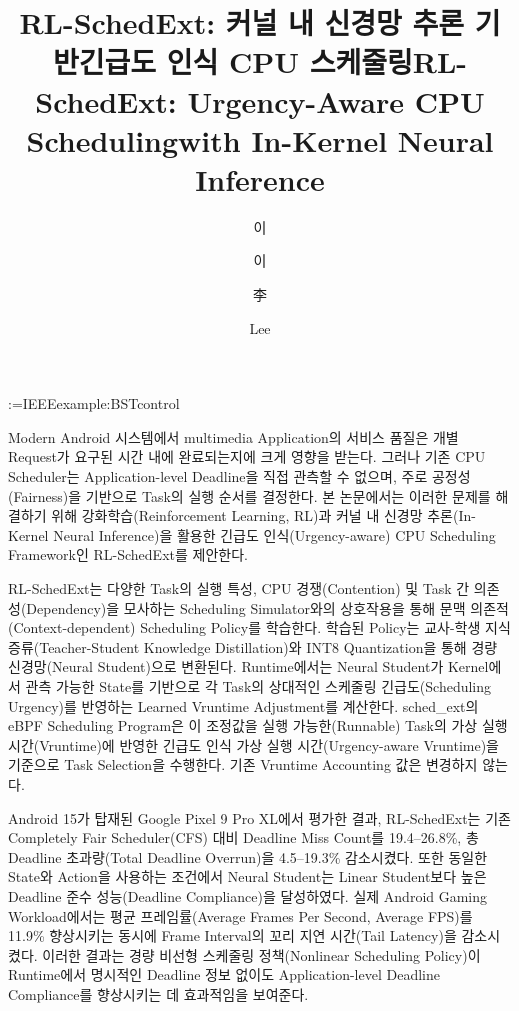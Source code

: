 \documentclass[master,korean,final]{kaist-ucs}
\title[korean] {RL-SchedExt: 커널 내 신경망 추론 기반\linebreak 긴급도 인식 CPU 스케줄링}
\title[english]{RL-SchedExt: Urgency-Aware CPU Scheduling\linebreak with In-Kernel Neural Inference}
\author[korean]{이}{재 원}
\author[korean2]{이}{재원}    %
\author[chinese]{李}{載遠}
\author[english]{Lee}{Jaewon}
\makeatletter
\providecommand{\bstctlcite}[1]{%
  \@bsphack
  \@for\@citeb:=#1\do{%
    \edef\@citeb{\expandafter\@firstofone\@citeb}%
    \if@filesw
      \immediate\write\@auxout{\string\citation{\@citeb}}%
    \fi
  }%
  \@esphack
}
\makeatother
\begin{document}
\bstctlcite{IEEEexample:BSTcontrol}


   \thesisinfo
    \begin{summary}      
    Modern Android 시스템에서 multimedia Application의 서비스 품질은 개별 Request가 요구된 시간 내에 완료되는지에 크게 영향을 받는다. 그러나 기존 CPU Scheduler는 Application-level Deadline을 직접 관측할 수 없으며, 주로 공정성(Fairness)을 기반으로 Task의 실행 순서를 결정한다. 본 논문에서는 이러한 문제를 해결하기 위해 강화학습(Reinforcement Learning, RL)과 커널 내 신경망 추론(In-Kernel Neural Inference)을 활용한 긴급도 인식(Urgency-aware) CPU Scheduling Framework인 RL-SchedExt를 제안한다.
    
    RL-SchedExt는 다양한 Task의 실행 특성, CPU 경쟁(Contention) 및 Task 간 의존성(Dependency)을 모사하는 Scheduling Simulator와의 상호작용을 통해 문맥 의존적(Context-dependent) Scheduling Policy를 학습한다. 학습된 Policy는 교사-학생 지식 증류(Teacher-Student Knowledge Distillation)와 INT8 Quantization을 통해 경량 신경망(Neural Student)으로 변환된다. Runtime에서는 Neural Student가 Kernel에서 관측 가능한 State를 기반으로 각 Task의 상대적인 스케줄링 긴급도(Scheduling Urgency)를 반영하는 Learned Vruntime Adjustment를 계산한다. sched\_ext의 eBPF Scheduling Program은 이 조정값을 실행 가능한(Runnable) Task의 가상 실행 시간(Vruntime)에 반영한 긴급도 인식 가상 실행 시간(Urgency-aware Vruntime)을 기준으로 Task Selection을 수행한다. 기존 Vruntime Accounting 값은 변경하지 않는다.
    
    Android 15가 탑재된 Google Pixel 9 Pro XL에서 평가한 결과, RL-SchedExt는 기존 Completely Fair Scheduler(CFS) 대비 Deadline Miss Count를 19.4–26.8\%, 총 Deadline 초과량(Total Deadline Overrun)을 4.5–19.3\% 감소시켰다. 또한 동일한 State와 Action을 사용하는 조건에서 Neural Student는 Linear Student보다 높은 Deadline 준수 성능(Deadline Compliance)을 달성하였다. 실제 Android Gaming Workload에서는 평균 프레임률(Average Frames Per Second, Average FPS)를 11.9\% 향상시키는 동시에 Frame Interval의 꼬리 지연 시간(Tail Latency)을 감소시켰다. 이러한 결과는 경량 비선형 스케줄링 정책(Nonlinear Scheduling Policy)이 Runtime에서 명시적인 Deadline 정보 없이도 Application-level Deadline Compliance를 향상시키는 데 효과적임을 보여준다.

    \end{summary}
   
\end{document}
